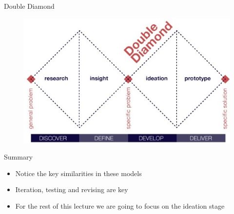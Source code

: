 
\begin{frame}{Double Diamond}
	\begin{figure}
		\includegraphics[width=1.0\textwidth, height=0.7\textheight]{double_diamond}
		\label{fig:double_diamond}
	\end{figure}
\end{frame}


\begin{frame}{Summary}
\begin{itemize}
	\item Notice the key similarities in these models
	\item Iteration, testing and revising are key
	\item For the rest of this lecture we are going to focus on the ideation stage
\end{itemize}
\end{frame}